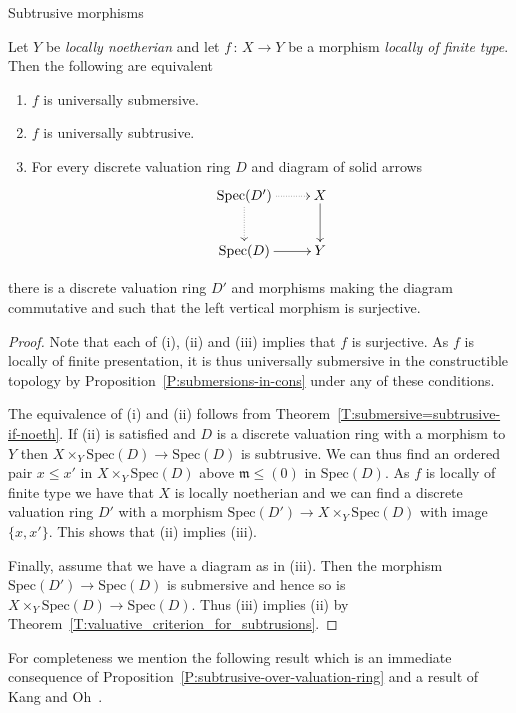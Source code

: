 \documentclass[a4paper,twoside,11pt]{amsart}[2009/07/02] %
\newcommand{\pref}[1]{\eqref{#1}}
\newcommand{\map}[3]{#1\,:\, #2\rightarrow #3}
\newcommand{\Spec}{\mathrm{Spec}}
\newcommand\im{\mathfrak{m}} %
\begin{document}
\begin{section}{Subtrusive morphisms}
\begin{corollary}\label{C:DVR-criterion-of-submersive}
Let $Y$ be \emph{locally noetherian} and let $\map{f}{X}{Y}$ be a morphism
\emph{locally of finite type}. Then the following are equivalent
%
\begin{enumerate}
\item $f$ is universally submersive.
\item $f$ is universally subtrusive.
\item For every discrete valuation ring $D$ and diagram of solid arrows
%
$$\xymatrix{
\Spec(D')\ar@{.>}[r]\ar@{.>}[d] & X\ar[d]\\
\Spec(D)\ar[r] & Y
}$$
\end{enumerate}
%
there is a discrete valuation ring $D'$ and morphisms making the diagram
commutative and such that the left vertical morphism is surjective.
\end{corollary}
\begin{proof}
Note that each of (i), (ii) and (iii) implies that $f$ is surjective. As $f$ is
locally of finite presentation, it is thus universally submersive in the
constructible topology by Proposition~\pref{P:submersions-in-cons}
under any of these conditions.

The equivalence of (i) and (ii) follows from
Theorem~\pref{T:submersive=subtrusive-if-noeth}. If (ii) is satisfied and $D$
is a discrete valuation ring with a morphism to $Y$ then $X\times_Y \Spec(D)\to
\Spec(D)$ is subtrusive. We can thus find an ordered pair $x\leq x'$ in
$X\times_Y \Spec(D)$ above $\im\leq (0)$ in $\Spec(D)$. As $f$ is locally of
finite type we have that $X$ is locally noetherian and we can find a discrete
valuation ring $D'$ with a morphism $\Spec(D')\to X\times_Y \Spec(D)$ with
image $\{x,x'\}$. This shows that (ii) implies (iii).

Finally, assume that we have a diagram as in (iii). Then the morphism
$\Spec(D')\to \Spec(D)$ is submersive and hence so is $X\times_Y \Spec(D)\to
\Spec(D)$.
Thus (iii) implies (ii) by
Theorem~\pref{T:valuative_criterion_for_subtrusions}.
\end{proof}

For completeness we mention the following result which is an immediate
consequence of Proposition~\pref{P:subtrusive-over-valuation-ring} and
a result of Kang and Oh~\cite{kang-oh_lifting-chains}.

%
% 


\end{section}
\end{document}
